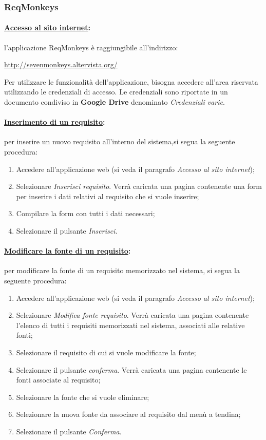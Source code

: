 \subsubsection{ReqMonkeys}
\label{reqmonkeys}

\paragraph{\underline{Accesso al sito internet}:}
l'applicazione ReqMonkeys è raggiungibile all'indirizzo:
\begin{center}
\url{http://sevenmonkeys.altervista.org/}
\end{center}
Per utilizzare le funzionalità dell'applicazione, bisogna accedere all'area riservata utilizzando le credenziali di accesso. Le credenziali sono riportate in un documento condiviso in \textbf{Google Drive} denominato \textit{Credenziali varie}.

\paragraph{\underline{Inserimento di un requisito}:}
per inserire un nuovo requisito all'interno del sistema,si segua la seguente procedura:
\begin{enumerate}
\item Accedere all'applicazione web (si veda il paragrafo \textit{Accesso al sito internet});
\item Selezionare \textit{Inserisci requisito}. Verrà caricata una pagina contenente una form per inserire i dati relativi al requisito che si vuole inserire;
\item Compilare la form con tutti i dati necessari;
\item Selezionare il pulsante \textit{Inserisci}.
\end{enumerate}

\paragraph{\underline{Modificare la fonte di un requisito}:}
per modificare la fonte di un requisito memorizzato nel sistema, si segua la seguente procedura:
\begin{enumerate}
\item Accedere all'applicazione web (si veda il paragrafo \textit{Accesso al sito internet});
\item Selezionare \textit{Modifica fonte requisito}. Verrà caricata una pagina contenente l'elenco di tutti i requisiti memorizzati nel sistema, associati alle relative fonti;
\item Selezionare il requisito di cui si vuole modificare la fonte;
\item Selezionare il pulsante \textit{conferma}. Verrà caricata una pagina contenente le fonti associate al requisito;
\item Selezionare la fonte che si vuole eliminare;
\item Selezionare la nuova fonte da associare al requisito dal menù a tendina;
\item Selezionare il pulsante \textit{Conferma}.
\end{enumerate}

